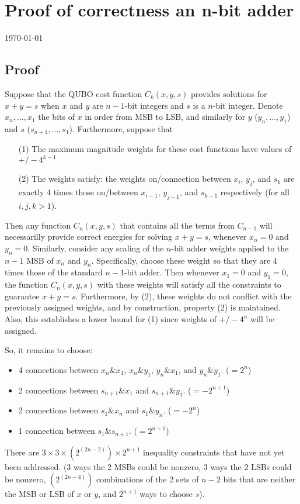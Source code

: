 \documentclass[12pt]{article}
\begin{document}
\section*{Proof of correctness an n-bit adder}
\today

\subsection*{Proof}

Suppose that the QUBO cost function $C_k(x,y,s)$ provides solutions for
$x+y=s$ when $x$ and $y$ are $n-1$-bit integers and $s$ is a $n$-bit
integer.
Denote $x_n, \ldots, x_1$ the bits of $x$ in order from MSB to LSB, and
similarly for $y$ ($y_n, \ldots, y_1$) and $s$ ($s_{n+1}, \ldots, s_1$).
Furthermore, suppose that
\begin{enumerate}
\item[(1)] The maximum magnitude weights for these
cost functions have values of $+/- 4^{k-1}$
\item[(2)] The weights satisfy: the weights on/connection between
$x_i$, $y_j$, and $s_k$ are exactly 4 times those on/between
$x_{i-1}$, $y_{j-1}$, and $s_{k-1}$
respectively (for all $i,j,k > 1$).
\end{enumerate}
Then any function $C_n(x,y,s)$ that contains all the terms from
$C_{n-1}$ will necessarilly provide correct energies for solving $x+y=s$,
whenever $x_n = 0$ and $y_n = 0$.
Similarly, consider any scaling of the $n$-bit adder weights applied
to the $n-1$ MSB of $x_n$ and $y_n$. 
Specifically, choose these weight so that they are 4 times those of the
standard $n-1$-bit adder.
Then whenever $x_1=0$ and $y_1=0$, the function $C_n(x,y,s)$ with these
weights will satisfy all the constraints to guarantee $x+y=s$.
Furthermore, by (2), these weights do not conflict with the previously
assigned weights, and by construction, property (2) is maintained.
Also, this establishes a lower bound for (1) since weights of
$+/- 4^n$ will be assigned.

So, it remains to choose:
\begin{itemize}
\item 4 connections between $x_n \& x_1$, $x_n \& y_1$, $y_n \& x_1$,
and $y_n \& y_1$. ($=2^n$)
\item 2 connections between $s_{n+1} \& x_1$ and $s_{n+1} \& y_1$.
($=-2^{n+1}$)
\item 2 connections between $s_1 \& x_n$ and $s_1 \& y_n$.
($=-2^n$)
\item 1 connection between $s_1 \& s_{n+1}$. ($=2^{n+1}$)
\end{itemize}

There are $3\times 3 \times (2^{(2n-2)}) \times 2^{n+1}$ inequality
constraints that have not yet been addressed.
(3 ways the 2 MSBs could be nonzero, 3 ways the 2 LSBs could be nonzero,
$(2^{(2n-4)})$ combinations of the 2 sets of $n-2$ bits that are neither
the MSB or LSB of $x$ or $y$, and $2^{n+1}$ ways to choose $s$).
\end{document}

